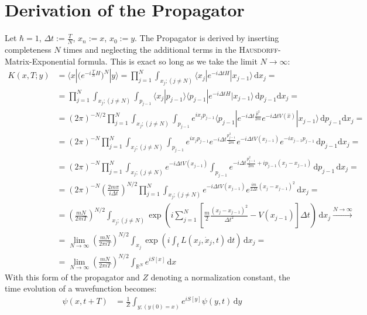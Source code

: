 \documentclass[a4paper,12pt]{article}
\newcommand{\brak}{}
\newcommand{\braket}{}
\newcommand{\kla}{}
\newcommand{\klam}{}
\begin{document}
\section{Derivation of the Propagator}
Let $\hbar=1$, $\Delta t:=\frac{T}{N}$, $x_n:=x$, $x_0:=y$. The Propagator is derived by inserting completeness $N$ times and neglecting the additional terms in the \textsc{Hausdorff}-Matrix-Exponential formula. This is exact so long as we take the limit $N\rightarrow\infty$:
\begin{align*}
K(x,T;y)&=\braket\langle {x} | {\kla\big( {e^{-i\frac{T}{N}H}} \big)^N} | {y}\rangle=\prod_{j=1}^{N}\int_{x_j;(j\neq N)}\braket\langle {x_{j}} | {e^{-i\Delta tH}} | {x_{j-1}}\rangle\,\mathrm{d}x_j=\\
&=\prod_{j=1}^N\int_{x_j;(j\neq N)}\int_{p_{j-1}}\brak\langle {x_j}| {p_{j-1}}\rangle\braket\langle {p_{j-1}} | {e^{-i\Delta tH}} | {x_{j-1}}\rangle\,\mathrm{d}p_{j-1}\mathrm{d}x_j=\\
&=(2\pi)^{-N/2}\prod_{j=1}^N\int_{x_j;(j\neq N)}\int_{p_{j-1}}e^{ix_jp_{j-1}}\braket\langle {p_{j-1}} | {e^{-i\Delta t\frac{\hat{p}^2}{2m}}e^{-i\Delta tV(\hat{x})}} | {x_{j-1}}\rangle\,\mathrm{d}p_{j-1}\mathrm{d}x_j=\\
&=(2\pi)^{-N}\prod_{j=1}^N\int_{x_j;(j\neq N)}\int_{p_{j-1}}e^{ix_jp_{j-1}}e^{-i\Delta t\frac{p_{j-1}^2}{2m}}e^{-i\Delta tV(x_{j-1})}e^{-ix_{j-1}p_{j-1}}\,\mathrm{d}p_{j-1}\mathrm{d}x_j=\\
&=(2\pi)^{-N}\prod_{j=1}^N\int_{x_j;(j\neq N)}e^{-i\Delta tV(x_{j-1})}{\int_{p_{j-1}}e^{-i\Delta t\frac{p_{j-1}^2}{2m}+ip_{j-1}(x_j-x_{j-1})}\,\mathrm{d}p_{j-1}}\,\mathrm{d}x_j= \\
&=(2\pi)^{-N}\kla\left( {\frac{2m\pi}{i\Delta t}} \right)^{N/2}\prod_{j=1}^N\int_{x_j;(j\neq N)}e^{-i\Delta tV(x_{j-1})}e^{\frac{im}{2\Delta t}(x_j-x_{j-1})^2}\,\mathrm{d}x_j=\\
&=\kla\left( {\frac{mN}{2\pi iT}} \right)^{N/2}\int_{x_j;(j\neq N)}\exp\kla\left( {i\sum_{j=1}^N\klam\left[ {\frac{m}{2}\frac{(x_j-x_{j-1})^2}{\Delta t^2}-V(x_{j-1})} \right]\Delta t} \right)\,\mathrm{d}x_j\overset{N\rightarrow\infty}{\rightarrow}\\
&=\lim_{N\rightarrow\infty}\kla\left( {\frac{mN}{2\pi iT}} \right)^{N/2}\int_{x_j}\exp\kla\left( {i\int_tL(x_j,\dot{x}_j,t)\,\mathrm{d}t} \right)\,\mathrm{d}x_j=\\
&=\lim_{N\rightarrow\infty}\kla\left( {\frac{mN}{2\pi iT}} \right)^{N/2}\int_{\mathbb{R}^N} e^{iS[x]}\,\mathrm{d}x
\end{align*}
With this form of the propagator and $Z$ denoting a normalization constant, the time evolution of a wavefunction becomes:
\begin{align*}
\psi(x,t+T)&=\frac{1}{Z}\int_{y;(y(0)=x)}e^{iS[y]}\psi(y,t)\,\mathrm{d}y
\end{align*}
\end{document}
